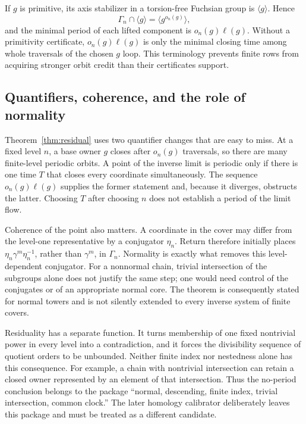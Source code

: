 \documentclass[11pt]{article}
\theoremstyle{definition}
\theoremstyle{remark}
\begin{document}
If $g$ is primitive, its axis stabilizer in a torsion-free Fuchsian group is $\langle g\rangle$. Hence
\[
\Gamma_n\cap\langle g\rangle=\langle g^{o_n(g)}\rangle,
\]
and the minimal period of each lifted component is $o_n(g)\ell(g)$. Without a primitivity certificate, $o_n(g)\ell(g)$ is only the minimal closing time among whole traversals of the chosen $g$ loop. This terminology prevents finite rows from acquiring stronger orbit credit than their certificates support.

\subsection{Quantifiers, coherence, and the role of normality}

Theorem~\ref{thm:residual} uses two quantifier changes that are easy to miss. At a fixed level $n$, a base owner $g$ closes after $o_n(g)$ traversals, so there are many finite-level periodic orbits. A point of the inverse limit is periodic only if there is one time $T$ that closes every coordinate simultaneously. The sequence $o_n(g)\ell(g)$ supplies the former statement and, because it diverges, obstructs the latter. Choosing $T$ after choosing $n$ does not establish a period of the limit flow.

Coherence of the point also matters. A coordinate in the cover may differ from the level-one representative by a conjugator $\eta_n$. Return therefore initially places $\eta_n\gamma^m\eta_n^{-1}$, rather than $\gamma^m$, in $\Gamma_n$. Normality is exactly what removes this level-dependent conjugator. For a nonnormal chain, trivial intersection of the subgroups alone does not justify the same step; one would need control of the conjugates or of an appropriate normal core. The theorem is consequently stated for normal towers and is not silently extended to every inverse system of finite covers.

Residuality has a separate function. It turns membership of one fixed nontrivial power in every level into a contradiction, and it forces the divisibility sequence of quotient orders to be unbounded. Neither finite index nor nestedness alone has this consequence. For example, a chain with nontrivial intersection can retain a closed owner represented by an element of that intersection. Thus the no-period conclusion belongs to the package ``normal, descending, finite index, trivial intersection, common clock.'' The later homology calibrator deliberately leaves this package and must be treated as a different candidate.
\end{document}
